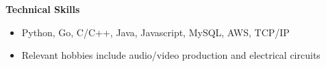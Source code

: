 \documentclass[letterpaper,11pt]{article}
\makeatletter
\newcommand{\resitem}[1]{\item #1 \vspace{-2pt}}
\newcommand{\resheading}[1]{{\large \colorbox{mygrey}{\begin{minipage}{\textwidth}{\textbf{#1 \vphantom{p\^{E}}}}\end{minipage}}}}
\newcommand{\resoneheadingit}[2]{
\begin{tabular*}{18.5cm}{l@{\extracolsep{\fill}}r}
		\textbf{#1} & \textit{#2} \\
\end{tabular*}\vspace{-6pt}}
\makeatother
\begin{document}
%


\resheading{Technical Skills}
\begin{itemize}
\resitem{Python, Go, C/C++, Java, Javascript, MySQL, AWS, TCP/IP}
\resitem{Relevant hobbies include audio/video production and electrical circuits}
\end{itemize}

\end{document}

